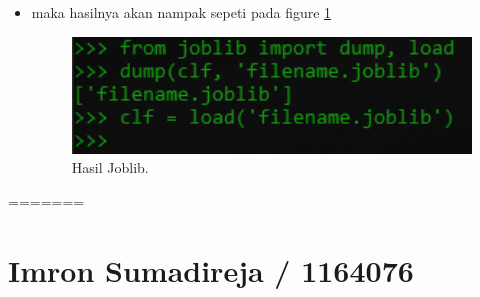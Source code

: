 \begin{enumerate}
\begin{itemize}
\item
maka hasilnya akan nampak sepeti pada figure \ref{HasilJoblib}

\begin{figure}[ht]
\centerline{\includegraphics[width=1\textwidth]{figures/YN3.PNG}}
\caption{Hasil Joblib.}
\label{HasilJoblib}
\end{figure}

\end{itemize}

\end{enumerate}
=======
\section{Imron Sumadireja / 1164076}
